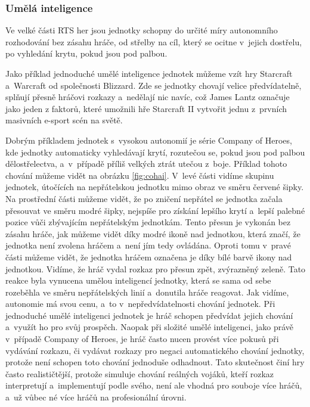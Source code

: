 \subsubsection{Umělá inteligence}

Ve velké části RTS her jsou jednotky schopny do určité míry autonomního rozhodování bez zásahu hráče, od střelby na cíl, který se ocitne v~jejich dostřelu, po vyhledání krytu, pokud jsou pod palbou. 

Jako příklad jednoduché umělé inteligence jednotek můžeme vzít hry Starcraft\citep{site:starcraft} a~Warcraft\citep{site:warcraft3} od společnosti Blizzard\citep{site:blizz}. Zde se jednotky chovají velice předvídatelně, splňují přesně hráčovi rozkazy a~nedělají nic navíc, což James Lantz\citep{site:gamasutra01} označuje jako jeden z faktorů, které umožnili hře Starcraft II vytvořit jednu z~prvních masivních e-sport scén na světě.



Dobrým příkladem jednotek s~vysokou autonomií je série Company of Heroes\citep{site:COH}, kde jednotky automaticky vyhledávají krytí, rozutečou se, pokud jsou pod palbou dělostřelectva, a~v~případě příliš velkých ztrát utečou z~boje. Příklad tohoto chování můžeme vidět na obrázku \ref{fig:cohai}. V~levé části vidíme skupinu jednotek, útočících na nepřátelskou jednotku mimo obraz ve směru červené šipky. Na prostřední části můžeme vidět, že po zničení nepřátel se jednotka začala přesouvat ve směru modré šipky, nejspíše pro získání lepšího krytí a~lepší palebné pozice vůči zbývajícím nepřátelským jednotkám. Tento přesun je vykonán bez zásahu hráče, jak můžeme vidět díky modré ikoně nad jednotkou, která značí, že jednotka není zvolena hráčem a~není jím tedy ovládána. Oproti tomu v~pravé části můžeme vidět, že jednotka hráčem označena je díky bílé barvě ikony nad jednotkou. Vidíme, že hráč vydal rozkaz pro přesun zpět, zvýrazněný zeleně. Tato reakce byla vynucena umělou inteligencí jednotky, která se sama od sebe rozeběhla ve směru nepřátelských linií a~donutila hráče reagovat. Jak vidíme, autonomie má svou cenu, a~to v~nepředvídatelnosti chování jednotek. Při jednoduché umělé inteligenci jednotek je hráč schopen předvídat jejich chování a~využít ho pro svůj prospěch. Naopak při složité umělé inteligenci, jako právě v~případě Company of Heroes, je hráč často nucen provést více pokusů při vydávání rozkazu, či vydávat rozkazy pro negaci automatického chování jednotky, protože není schopen toto chování jednoduše odhadnout. Tato skutečnost činí hry často realističtější, protože simuluje chování reálných vojáků, kteří rozkaz interpretují a~implementují podle svého, není ale vhodná pro souboje více hráčů, a~už vůbec né více hráčů na profesionální úrovni.

